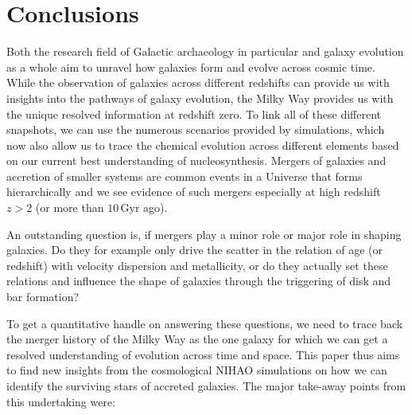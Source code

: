 \documentclass[fleqn,usenatbib]{mnras}
\begin{document}
\section{Conclusions}
\label{sec:conc}

Both the research field of Galactic archaeology in particular and galaxy evolution as a whole aim to unravel how galaxies form and evolve across cosmic time. While the observation of galaxies across different redshifts can provide us with insights into the pathways of galaxy evolution, the Milky Way provides us with the unique resolved information at redshift zero. To link all of these different snapshots, we can use the numerous scenarios provided by simulations, which now also allow us to trace the chemical evolution across different elements based on our current best understanding of nucleosynthesis. Mergers of galaxies and accretion of smaller systems are common events in a Universe that forms hierarchically and we see evidence of such mergers especially at high redshift $z > 2$ (or more than $10\,\mathrm{Gyr}$ ago).

An outstanding question is, if mergers play a minor role or major role in shaping galaxies. Do they for example only drive the scatter in the relation of age (or redshift) with velocity dispersion and metallicity, or do they actually set these relations and influence the shape of galaxies through the triggering of disk and bar formation?

To get a quantitative handle on answering these questions, we need to trace back the merger history of the Milky Way as the one galaxy for which we can get a resolved understanding of evolution across time and space. This paper thus aims to find new insights from the cosmological \textsc{NIHAO} simulations on how we can identify the surviving stars of accreted galaxies. The major take-away points from this undertaking were:
\end{document}
